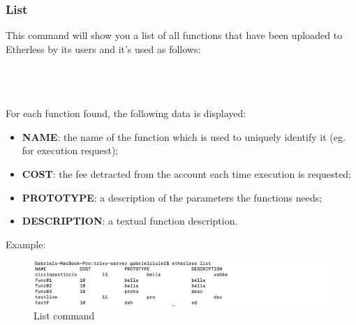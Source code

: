\subsubsection{List}
This command will show you a list of all functions that have been uploaded to Etherless by its users and it's used as follows:\\\\
\centerline {}\\\\
For each function found, the following data is displayed:
\begin{itemize}
	\item \textbf{NAME}: the name of the function which is used to uniquely identify it (eg. for execution request);
	\item \textbf{COST}: the fee detracted from the account each time execution is requested;
	\item \textbf{PROTOTYPE}: a description of the parameters the functions needs;
	\item \textbf{DESCRIPTION}: a textual function description.
\end{itemize}
Example:
\begin{figure}[h]
	\begin{center}
	\includegraphics[width=\textwidth]{res/img/list.png}
	\caption{List command}
	\end{center}
\end{figure}
